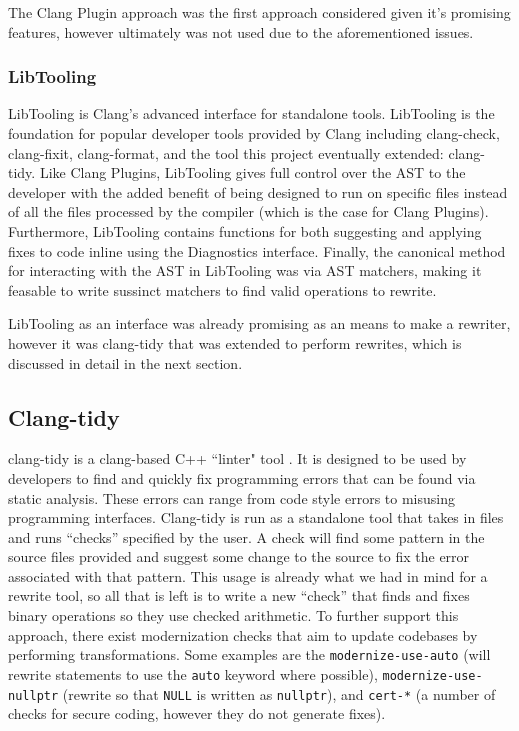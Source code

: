 The Clang Plugin approach was the first approach considered given it's promising features, however ultimately was not used due to the aforementioned issues.

\subsubsection{LibTooling}

LibTooling is Clang's advanced interface for standalone tools. LibTooling is the foundation for popular developer tools provided by Clang including clang-check, clang-fixit, clang-format, and the tool this project eventually extended: clang-tidy. Like Clang Plugins, LibTooling gives full control over the AST to the developer with the added benefit of being designed to run on specific files instead of all the files processed by the compiler (which is the case for Clang Plugins). Furthermore, LibTooling contains functions for both suggesting and applying fixes to code inline using the Diagnostics interface. Finally, the canonical method for interacting with the AST in LibTooling was via AST matchers, making it feasable to write sussinct matchers to find valid operations to rewrite.

LibTooling as an interface was already promising as an means to make a rewriter, however it was clang-tidy that was extended to perform rewrites, which is discussed in detail in the next section.

\subsection{Clang-tidy}

clang-tidy is a clang-based C++ ``linter" tool \cite{clang-tidy}. It is designed to be used by developers to find and quickly fix programming errors that can be found via static analysis. These errors can range from code style errors to misusing programming interfaces. Clang-tidy is run as a standalone tool that takes in files and runs ``checks'' specified by the user. A check will find some pattern in the source files provided and suggest some change to the source to fix the error associated with that pattern. This usage is already what we had in mind for a rewrite tool, so all that is left is to write a new ``check'' that finds and fixes binary operations so they use checked arithmetic. To further support this approach, there exist modernization checks that aim to update codebases by performing transformations. Some examples are the \texttt{modernize-use-auto} (will rewrite statements to use the \texttt{auto} keyword where possible), \texttt{modernize-use-nullptr} (rewrite so that \texttt{NULL} is written as \texttt{nullptr}), and \texttt{cert-*} (a number of checks for secure coding, however they do not generate fixes).


